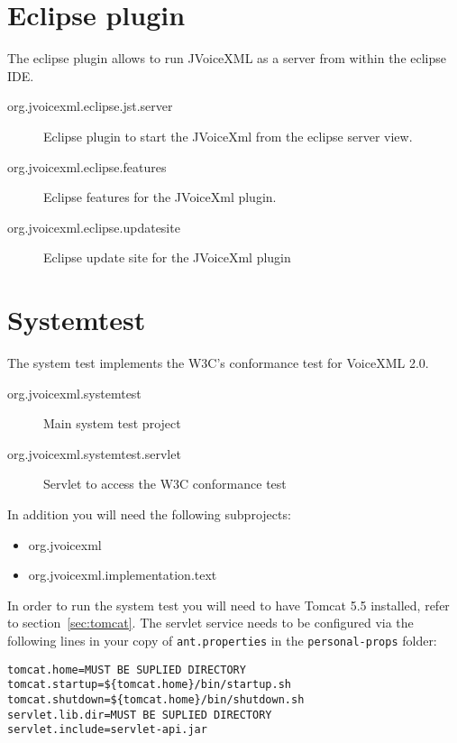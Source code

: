 \documentclass[11pt,a4paper]{article}
\begin{document}
\section{Eclipse plugin}

The eclipse plugin allows to run JVoiceXML as a server from within the eclipse
IDE.

\begin{description}
\item[org.jvoicexml.eclipse.jst.server] Eclipse plugin to start the JVoiceXml
from the eclipse server view.
\item[org.jvoicexml.eclipse.features] Eclipse features for the JVoiceXml
plugin.
\item[org.jvoicexml.eclipse.updatesite] Eclipse update site for the
JVoiceXml plugin
\end{description}

\section{Systemtest}

The system test implements the W3C's conformance test for VoiceXML 2.0.

\begin{description}
\item[org.jvoicexml.systemtest] Main system test project
\item[org.jvoicexml.systemtest.servlet] Servlet to access the W3C conformance
test
\end{description}

In addition you will need the following subprojects:
\begin{itemize}
\item org.jvoicexml
\item org.jvoicexml.implementation.text
\end{itemize} 

In order to run the system test you will need to have Tomcat 5.5 installed,
refer to section~\ref{sec:tomcat}. The
servlet service needs to be configured via the following lines in your copy
of \lstinline{ant.properties} in the \lstinline{personal-props} folder:

\begin{lstlisting}
tomcat.home=MUST BE SUPLIED DIRECTORY
tomcat.startup=${tomcat.home}/bin/startup.sh
tomcat.shutdown=${tomcat.home}/bin/shutdown.sh
servlet.lib.dir=MUST BE SUPLIED DIRECTORY
servlet.include=servlet-api.jar
\end{lstlisting}
\end{document}

